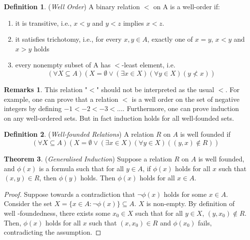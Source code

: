 \documentclass[14pt]{article}
\theoremstyle{definition}
\newtheorem*{remark}{Remarks}
\newtheorem{definition}{Definition}[subsection]
\newtheorem{theorem}[definition]{Theorem}
\begin{document}
\vspace{2mm}

\begin{definition}
    (\textit{Well Order}) A binary relation $<$ on A is a well-order if:
\begin{enumerate}
    \item it is transitive, i.e., $x<y$ and $y<z$ implies $x<z$.
    \item it satisfies trichotomy, i.e., for every $x,y\in A$,  exactly one of $x=y$, $x<y$ and $x>y$ holds
    \item every nonempty subset of A has $<$-least element, i.e. \begin{equation*}
        (\forall X\subseteq A)(X=\emptyset \vee (\exists x\in X)(\forall y\in X)(y\not<x))
    \end{equation*}
\end{enumerate}
\end{definition}

\begin{remark}
    This relation "$<$" should not be interpreted as the usual $<$. For example, one can prove that a relation $<$ is a well order on the set of negative integers by defining $-1<-2<-3<...$.  Furthermore, one can prove induction on any well-ordered sets. But in fact induction holds for all well-founded sets.
\end{remark}

\vspace{2mm}

\begin{definition}
    (\textit{Well-founded Relations}) A relation $R$ on $A$ is well founded if
    \begin{equation*}
        (\forall X\subseteq A)(X=\emptyset \vee (\exists x\in X)(\forall y\in X)((y,x)\notin R))
    \end{equation*}
\end{definition}
\vspace{2mm}
\begin{theorem}
    (\textit{Generalised Induction}) Suppose a relation $R$ on $A$ is well founded, and $\phi(x)$ is a formula such that for all $y\in A$, if $\phi(x)$ holds for all $x$ such that $(x, y)\in R$, then $\phi(y)$ holds.  Then $\phi(x)$ holds for all $x\in A$.
\end{theorem}
\begin{proof}
    Suppose towards a contradiction that $\neg \phi(x)$ holds for some $x\in A$. Consider the set $X=\{x\in A:\neg\phi(x)\}\subseteq A$. $X$ is non-empty.  By definition of  well -foundedness,  there exists some $x_0\in X$ such that for all $y\in X$, $(y,x_0)\not\in R$. Then,  $\phi(x)$ holds  for all $x$ such that  $(x,x_0)\in R$  and $\phi(x_0)$ fails, contradicting the assumption. 
\end{proof}
\newpage
\end{document}
